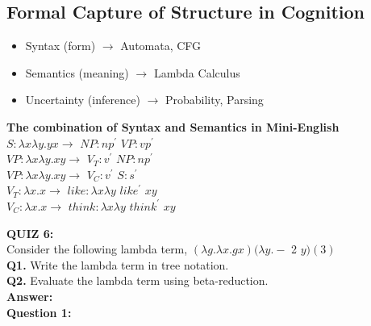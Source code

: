 \documentclass[12pt,a4paper]{article}
\begin{document}
{\subsection{Formal Capture of Structure in Cognition}

\begin{itemize}
\item Syntax (form) $\rightarrow$ Automata, CFG
\item Semantics (meaning) $\rightarrow$ Lambda Calculus
\item Uncertainty (inference) $\rightarrow$ Probability, Parsing
\end{itemize}

\textbf{The combination of Syntax and Semantics in Mini-English}\\

$S:\lambda x \lambda y.yx\rightarrow$ $NP:np^{'}$ $VP:vp^{'}$\\
\indent $VP:\lambda x \lambda y.xy\rightarrow$ $V_{T}:v^{'}$ $NP:np^{'}$\\
\indent $VP:\lambda x \lambda y.xy\rightarrow$ $V_{C}:v^{'}$ $S:s^{'}$\\
\indent $V_{T}:\lambda x.x\rightarrow$ $like:\lambda x \lambda y$ $like^{'}$ $xy$\\
\indent $V_{C}:\lambda x.x\rightarrow$ $think:\lambda x \lambda y$ $think^{'}$ $xy$\\


\clearpage

\noindent \textbf{\Large{QUIZ 6:}}\\
Consider the following lambda term, $(\lambda g.\lambda x.gx)(\lambda y.-$ 2 $y)(3)$\\

\textbf{Q1.} Write the lambda term in tree notation.\\
\indent \textbf{Q2.} Evaluate the lambda term using beta-reduction.\\

\noindent \textbf{\Large{Answer:}}\\

\textbf{Question 1:}\\

\\

}
\end{document}

